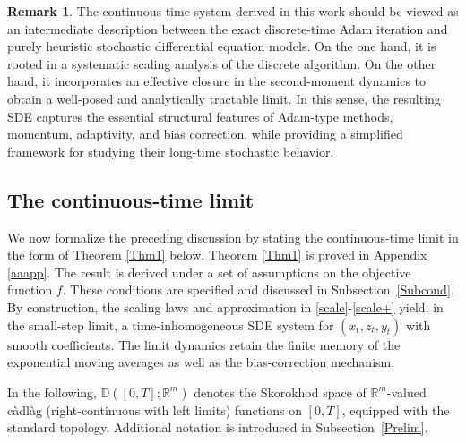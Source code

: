 \documentclass[11pt, a4paper,leqno]{amsart}
\theoremstyle{definition}
\newtheorem{remark}{Remark}[section]
\numberwithin{equation}{section}
\begin{document}
\begin{remark}
The continuous-time system derived in this work should be viewed as an intermediate description between the exact discrete-time Adam iteration and purely heuristic stochastic differential equation models. On the one hand, it is rooted in a systematic scaling analysis of the discrete algorithm. On the other hand, it incorporates an effective closure in the second-moment dynamics to obtain a well-posed and analytically tractable limit. In this sense, the resulting SDE captures the essential structural features of Adam-type methods, momentum, adaptivity, and bias correction, while providing a simplified framework for studying their long-time stochastic behavior.
\end{remark}

\subsection{The continuous-time limit} We now formalize the preceding discussion by stating the continuous-time limit in the form of Theorem \ref{Thm1} below. Theorem \ref{Thm1} is proved in Appendix
\ref{aaapp}. The result is derived under a set of assumptions on the objective function $f$. These conditions are specified and discussed in Subsection~\ref{Subcond}. By construction, the scaling laws and approximation in \eqref{scale}-\eqref{scale+} yield, in the small-step limit, a time-inhomogeneous SDE system for $(x_t,z_t,y_t)$ with smooth coefficients. The limit dynamics retain the finite memory of the exponential moving averages as well as the bias-correction mechanism.

In the following,  $\mathbb{D}([0,T];\mathbb{R}^m)$ denotes the Skorokhod space of
$\mathbb{R}^m$-valued càdlàg (right-continuous with left limits) functions
on $[0,T]$, equipped with the standard topology. Additional notation is introduced in Subsection~\ref{Prelim}.
\end{document}

